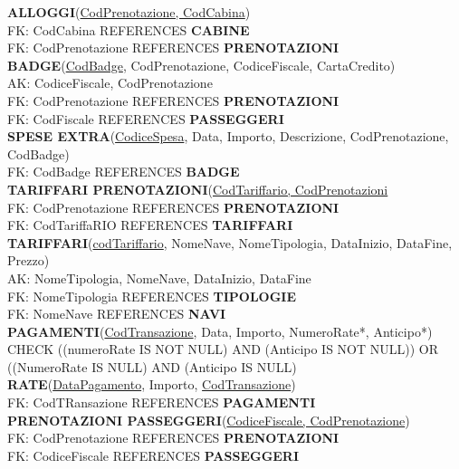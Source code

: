 \documentclass[a4paper, titlepage]{report}
\begin{document}
\noindent
\textbf{ALLOGGI}(\underline{CodPrenotazione, CodCabina}) \\
FK: CodCabina REFERENCES \textbf{CABINE}\\
FK: CodPrenotazione REFERENCES \textbf{PRENOTAZIONI}\\

\noindent
\textbf{BADGE}(\underline{CodBadge}, CodPrenotazione, CodiceFiscale, CartaCredito) \\
AK: CodiceFiscale, CodPrenotazione \\
FK: CodPrenotazione REFERENCES \textbf{PRENOTAZIONI}\\
FK: CodFiscale REFERENCES \textbf{PASSEGGERI}\\

\noindent
\textbf{SPESE EXTRA}(\underline{CodiceSpesa}, Data, Importo, Descrizione, CodPrenotazione, CodBadge) \\
FK: CodBadge REFERENCES \textbf{BADGE}\\

\noindent
\textbf{TARIFFARI PRENOTAZIONI}(\underline{CodTariffario, CodPrenotazioni} \\
FK: CodPrenotazione REFERENCES \textbf{PRENOTAZIONI}\\
FK: CodTariffaRIO REFERENCES \textbf{TARIFFARI}\\

\noindent
\textbf{TARIFFARI}(\underline{codTariffario}, NomeNave, NomeTipologia, DataInizio, DataFine, Prezzo) \\
AK: NomeTipologia, NomeNave, DataInizio, DataFine \\
FK: NomeTipologia REFERENCES \textbf{TIPOLOGIE} \\
FK: NomeNave REFERENCES \textbf{NAVI}\\

\noindent
\textbf{PAGAMENTI}(\underline{CodTransazione}, Data, Importo, NumeroRate*, Anticipo*) \\ 
CHECK ((numeroRate IS NOT NULL) AND (Anticipo IS NOT NULL)) OR ((NumeroRate IS NULL) AND (Anticipo IS NULL) \\

\noindent
\textbf{RATE}(\underline{DataPagamento}, Importo, \underline{CodTransazione}) \\
FK: CodTRansazione REFERENCES \textbf{PAGAMENTI} \\

\noindent
\textbf{PRENOTAZIONI PASSEGGERI}(\underline{CodiceFiscale, CodPrenotazione}) \\
FK: CodPrenotazione REFERENCES \textbf{PRENOTAZIONI}\\
FK: CodiceFiscale REFERENCES \textbf{PASSEGGERI}\\
\end{document}
